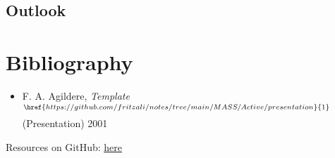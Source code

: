	\subsection{Outlook}

	\section{Bibliography}

	\begin{frame}
		\begin{center}\textcolor{MASS}{}\end{center}\vspace{2ex}
		\begin{itemize}
			\item F. A. Agildere, {\itshape{Template}}$^{\href{https://github.com/fritzali/notes/tree/main/MASS/Active/presentation}{1}}$
				  (Presentation) 2001
		\end{itemize}
		\vspace{2ex}
		Resources on GitHub: \href{https://github.com/fritzali/notes/tree/main/MASS/Active/presentation}{here}
	\end{frame}

